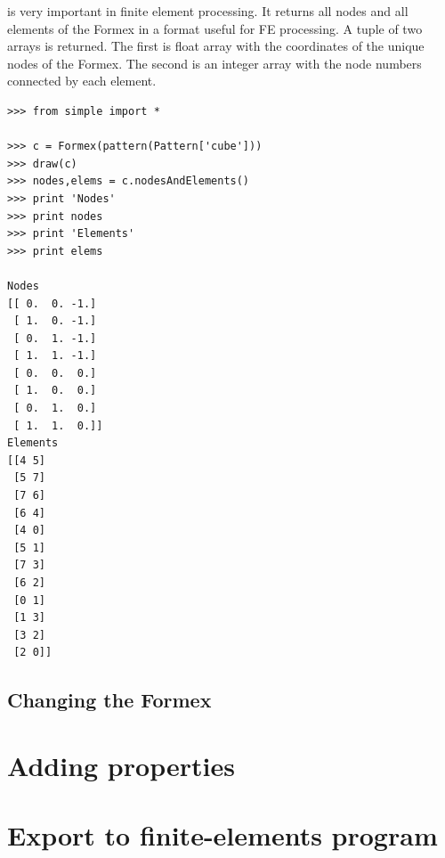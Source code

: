 \documentclass[a4paper]{manual}
\begin{document}
{ is very important in finite element processing. It returns all nodes and all elements of the Formex in a format useful for FE processing. A tuple of two arrays is returned. The first is float array with the coordinates of the unique nodes of the Formex. The second is an integer array with the node numbers connected by each element.
\begin{verbatim}
>>> from simple import *

>>> c = Formex(pattern(Pattern['cube']))
>>> draw(c)
>>> nodes,elems = c.nodesAndElements()
>>> print 'Nodes'
>>> print nodes
>>> print 'Elements'
>>> print elems

Nodes
[[ 0.  0. -1.]
 [ 1.  0. -1.]
 [ 0.  1. -1.]
 [ 1.  1. -1.]
 [ 0.  0.  0.]
 [ 1.  0.  0.]
 [ 0.  1.  0.]
 [ 1.  1.  0.]]
Elements
[[4 5]
 [5 7]
 [7 6]
 [6 4]
 [4 0]
 [5 1]
 [7 3]
 [6 2]
 [0 1]
 [1 3]
 [3 2]
 [2 0]]
\end{verbatim}

\subsection{Changing the Formex}
\label{subsec:changing}






%
\section{Adding properties}
\label{sec:props}


%
\section{Export to finite-elements program}


}
\end{document}
